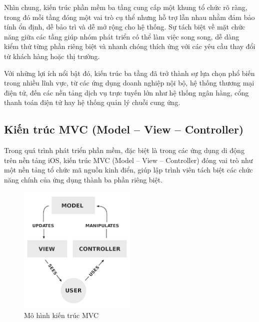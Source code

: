   \begin{flushleft}
  \hspace*{0.8cm}Nhìn chung, kiến trúc phần mềm ba tầng cung cấp một khung tổ chức rõ ràng, trong đó mỗi tầng đóng một vai trò cụ thể nhưng hỗ trợ lẫn nhau nhằm đảm bảo tính ổn định, dễ bảo trì và dễ mở rộng cho hệ thống. Sự tách biệt về mặt chức năng giữa các tầng giúp nhóm phát triển có thể làm việc song song, dễ dàng kiểm thử từng phần riêng biệt và nhanh chóng thích ứng với các yêu cầu thay đổi từ khách hàng hoặc thị trường.
  \end{flushleft}
  
  \begin{flushleft}
  \hspace*{0.8cm}Với những lợi ích nổi bật đó, kiến trúc ba tầng đã trở thành sự lựa chọn phổ biến trong nhiều lĩnh vực, từ các ứng dụng doanh nghiệp nội bộ, hệ thống thương mại điện tử, đến các nền tảng dịch vụ trực tuyến lớn như hệ thống ngân hàng, cổng thanh toán điện tử hay hệ thống quản lý chuỗi cung ứng.
  \end{flushleft}

\subsection{Kiến trúc MVC (Model – View – Controller)}
\renewcommand{\labelitemi}{--}    
    \begin{flushleft}
        \hspace*{0.8cm}Trong quá trình phát triển phần mềm, đặc biệt là trong các ứng dụng di động trên nền tảng iOS, kiến trúc MVC (Model – View – Controller) đóng vai trò như một nền tảng tổ chức mã nguồn kinh điển, giúp lập trình viên tách biệt các chức năng chính của ứng dụng thành ba phần riêng biệt.
    \end{flushleft}

\begin{figure}[H]
  \centering
  \includegraphics[width=0.5\textwidth]{images/mvc.png}
  \caption{Mô hình kiến trúc MVC}
  \label{fig:fig19}
\end{figure}

